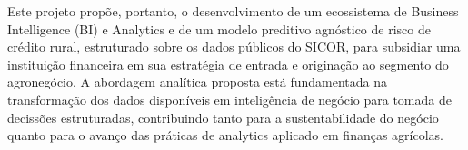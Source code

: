Este projeto propõe, portanto, o desenvolvimento de um ecossistema de Business Intelligence (BI) e Analytics e de um modelo preditivo agnóstico de risco de crédito rural, estruturado sobre os dados públicos do SICOR, para subsidiar uma instituição financeira em sua estratégia de entrada e originação ao segmento do agronegócio. A abordagem analítica proposta está fundamentada na transformação dos dados disponíveis em inteligência de negócio para tomada de decissões estruturadas, contribuindo tanto para a sustentabilidade do negócio quanto para o avanço das práticas de analytics aplicado em finanças agrícolas.
